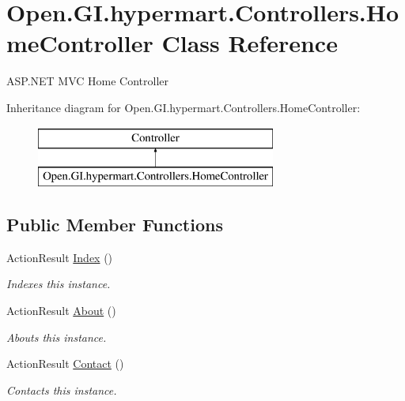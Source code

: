 \hypertarget{class_open_1_1_g_i_1_1hypermart_1_1_controllers_1_1_home_controller}{}\section{Open.\+G\+I.\+hypermart.\+Controllers.\+Home\+Controller Class Reference}
\label{class_open_1_1_g_i_1_1hypermart_1_1_controllers_1_1_home_controller}


A\+S\+P.\+N\+E\+T M\+V\+C Home Controller  


Inheritance diagram for Open.\+G\+I.\+hypermart.\+Controllers.\+Home\+Controller\+:\begin{figure}[H]
\begin{center}
\leavevmode
\includegraphics[height=2.000000cm]{class_open_1_1_g_i_1_1hypermart_1_1_controllers_1_1_home_controller}
\end{center}
\end{figure}
\subsection*{Public Member Functions}
\begin{DoxyCompactItemize}
\item 
Action\+Result \hyperlink{class_open_1_1_g_i_1_1hypermart_1_1_controllers_1_1_home_controller_a18ad180258caf702a7cfe51c16bf5558}{Index} ()
\begin{DoxyCompactList}\small\item\em Indexes this instance. \end{DoxyCompactList}\item 
Action\+Result \hyperlink{class_open_1_1_g_i_1_1hypermart_1_1_controllers_1_1_home_controller_a6d90d2a8ae2ce9f7c9ec38b175847e6f}{About} ()
\begin{DoxyCompactList}\small\item\em Abouts this instance. \end{DoxyCompactList}\item 
Action\+Result \hyperlink{class_open_1_1_g_i_1_1hypermart_1_1_controllers_1_1_home_controller_a758666761af826c9091b8a8655eb5e18}{Contact} ()
\begin{DoxyCompactList}\small\item\em Contacts this instance. \end{DoxyCompactList}\end{DoxyCompactItemize}


